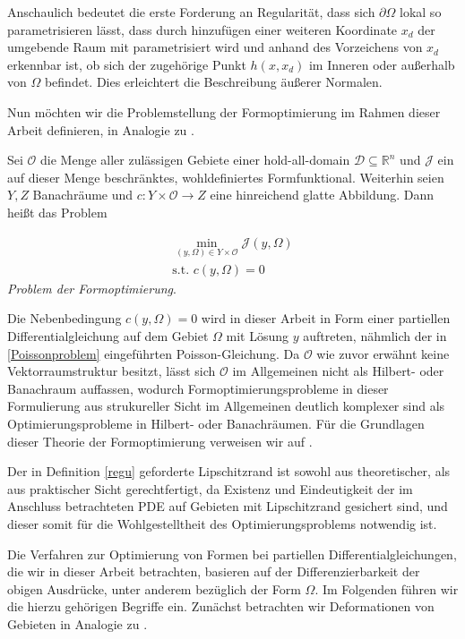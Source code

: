 Anschaulich bedeutet die erste Forderung an Regularität, dass sich $\partial\Omega$ lokal so parametrisieren lässt, dass durch hinzufügen einer weiteren Koordinate $x_d$ der umgebende Raum mit parametrisiert wird und anhand des Vorzeichens von $x_d$ erkennbar ist, ob sich der zugehörige Punkt $h(x,x_d)$ im Inneren oder außerhalb von $\Omega$ befindet. Dies erleichtert die Beschreibung äußerer Normalen.

Nun möchten wir die Problemstellung der Formoptimierung im Rahmen dieser Arbeit definieren, in Analogie zu \cite{LagrangeNewton}.

\begin{defi}
Sei $\mathcal{O}$ die Menge aller zulässigen Gebiete einer hold-all-domain $\mathcal{D}\subseteq\mathbb{R}^n$ und $\mathcal{J}$ ein auf dieser Menge beschränktes, wohldefiniertes Formfunktional. Weiterhin seien $Y,Z$ Banachräume und $c: Y\times \mathcal{O} \rightarrow Z$ eine hinreichend glatte Abbildung. Dann heißt das Problem

\begin{align*}
	\underset{(y,\Omega) \in Y \times \mathcal{O}}{\min} \mathcal{J}(y,\Omega) \\
	\text{s.t. } c(y, \Omega) = 0
\end{align*}
\textit{Problem der Formoptimierung}.
\end{defi}

Die Nebenbedingung $c(y, \Omega) = 0$ wird in dieser Arbeit in Form einer partiellen Differentialgleichung auf dem Gebiet $\Omega$ mit Lösung $y$ auftreten, nähmlich der in \ref{Poissonproblem} eingeführten Poisson-Gleichung. Da $\mathcal{O}$ wie zuvor erwähnt keine Vektorraumstruktur besitzt, lässt sich $\mathcal{O}$ im Allgemeinen nicht als Hilbert- oder Banachraum auffassen, wodurch Formoptimierungsprobleme in dieser Formulierung aus strukureller Sicht im Allgemeinen deutlich komplexer sind als Optimierungsprobleme in Hilbert- oder Banachräumen. Für die Grundlagen dieser Theorie der Formoptimierung verweisen wir auf \cite{shape_space}.

Der in Definition \ref{regu} geforderte Lipschitzrand ist sowohl aus theoretischer, als aus praktischer Sicht gerechtfertigt, da Existenz und Eindeutigkeit der im Anschluss betrachteten PDE auf Gebieten mit Lipschitzrand gesichert sind, und dieser somit für die Wohlgestelltheit des Optimierungsproblems notwendig ist. 

Die Verfahren zur Optimierung von Formen bei partiellen Differentialgleichungen, die wir in dieser Arbeit betrachten, basieren auf der Differenzierbarkeit der obigen Ausdrücke, unter anderem bezüglich der Form $\Omega$. Im Folgenden führen wir die hierzu gehörigen Begriffe ein. Zunächst betrachten wir Deformationen von Gebieten in Analogie zu \cite{bfgs2}.

